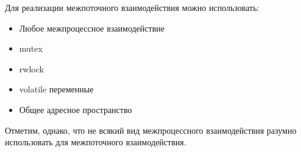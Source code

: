 Для реализации межпоточного взаимодействия можно использовать:

\begin{itemize}
	\item Любое межпроцессное взаимодействие 
	\item mutex
	\item rwlock 
	\item volatile переменные 
	\item Общее адресное пространство
\end{itemize}

Отметим, однако, что не всякий вид межпроцессного взаимодействия разумно использовать для межпоточного взаимодействия.